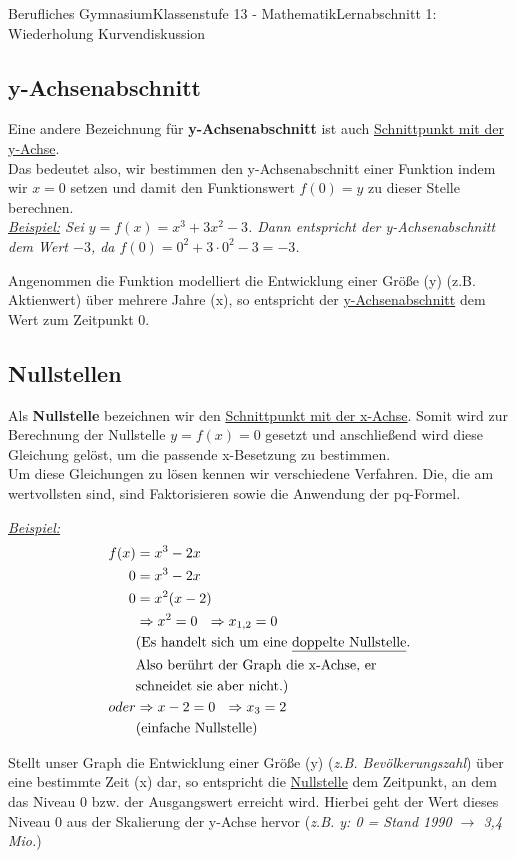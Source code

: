 \documentclass[11pt,twocolumn,oneside,openany,headings=optiontotoc,11pt,numbers=noenddot]{article}
\begin{document}
\begin{worksheet}{Berufliches Gymnasium}{Klassenstufe 13 - Mathematik}{Lernabschnitt 1: Wiederholung Kurvendiskussion}
		\subsection{y-Achsenabschnitt}
		Eine andere Bezeichnung für \textbf{y-Achsenabschnitt} ist auch \underline{Schnittpunkt mit der y-Achse}.\\
		Das bedeutet also, wir bestimmen den y-Achsenabschnitt einer Funktion indem wir \(x=0\) setzen und damit den Funktionswert \(f(0) = y\) zu dieser Stelle berechnen.\\
		\textit{\underline{Beispiel:} Sei \(y = f(x) = x^3 +3x^2 -3\). Dann entspricht der y-Achsenabschnitt dem Wert \(-3\), da \(f(0) = 0^2 +3\cdot{}0^2 -3 = -3\).}
		\begin{framed}
			\noindent
			Angenommen die Funktion modelliert die Entwicklung einer Größe (y) (z.B. Aktienwert) über mehrere Jahre (x), so entspricht der \underline{y-Achsenabschnitt} dem Wert zum Zeitpunkt 0.
		\end{framed}
		\subsection{Nullstellen}
		\label{nst}
		Als \textbf{Nullstelle} bezeichnen wir den \underline{Schnittpunkt mit der x-Achse}. Somit wird zur Berechnung der Nullstelle \(y = f(x) = 0\) gesetzt und anschließend wird diese Gleichung gelöst, um die passende x-Besetzung zu bestimmen.\\
		Um diese Gleichungen zu lösen kennen wir verschiedene Verfahren. Die, die am wertvollsten sind, sind \glqq{}Faktorisieren\grqq{} sowie die Anwendung der \glqq{}pq-Formel\grqq{}.\\
		\par\bigskip\noindent
		\textit{\underline{Beispiel:}}
		\begin{align*}
			f(x) & = x^3-2x\\
			0 & = x^3 -2x\\
			0 & = x^2(x-2)\\
			& \Rightarrow x^2 = 0\ \ \Rightarrow x_{1,2} = 0\\
			& \text{(Es handelt sich um eine \underline{doppelte Nullstelle}.}\\ & \text{Also berührt der Graph die x-Achse, er}\\
			& \text{schneidet sie aber nicht.)}\\
			oder & \Rightarrow x-2 = 0\ \ \Rightarrow x_3 = 2\\
			& \text{(einfache Nullstelle)}
		\end{align*}
		\begin{framed}
			\noindent
			Stellt unser Graph die Entwicklung einer Größe (y) (\textit{z.B. Bevölkerungszahl}) über eine bestimmte Zeit (x) dar, so entspricht die \underline{Nullstelle} dem Zeitpunkt, an dem das \glqq{}Niveau 0\grqq{} bzw. der Ausgangswert erreicht wird. Hierbei geht der Wert dieses \glqq{}Niveau 0\grqq{} aus der Skalierung der y-Achse hervor (\textit{z.B. y: 0 = Stand 1990 \(\rightarrow\) 3,4 Mio.})
		\end{framed}

\end{worksheet}
\end{document}
